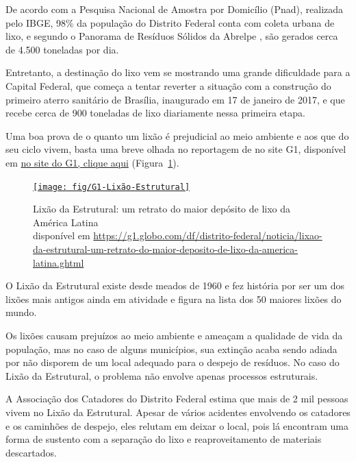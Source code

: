 De acordo com a Pesquisa Nacional de Amostra por Domicílio (Pnad), realizada pelo IBGE, 98\% da população do Distrito Federal conta com coleta urbana de lixo, e segundo o Panorama de Resíduos Sólidos da Abrelpe , são gerados cerca de 4.500 toneladas por dia.

Entretanto, a destinação do lixo vem se mostrando uma grande dificuldade para a Capital Federal, que começa a tentar reverter a situação com a construção do primeiro aterro sanitário de Brasília, inaugurado em 17 de janeiro de 2017, e que recebe cerca de 900 toneladas de lixo diariamente nessa primeira etapa.

Uma boa prova de o quanto um lixão é prejudicial ao meio ambiente e aos que do seu ciclo vivem, basta uma breve olhada no reportagem de  no site G1, disponível em \href{https://g1.globo.com/df/distrito-federal/noticia/lixao-da-estrutural-um-retrato-do-maior-deposito-de-lixo-da-america-latina.ghtml}{no site do G1, clique aqui} (Figura~\ref{fig:g1-lixao-estrutural}). \nocite{Marques2018}

\begin{figure}[h!]
    \centering
    \href{https://g1.globo.com/df/distrito-federal/noticia/lixao-da-estrutural-um-retrato-do-maior-deposito-de-lixo-da-america-latina.ghtml}{
        \texttt{[image: fig/G1-Lixão-Estrutural]}
    }
    \caption[Lixão da Estrutural]{Lixão da Estrutural: um retrato do maior depósito de lixo da América Latina \\ disponível em \url{https://g1.globo.com/df/distrito-federal/noticia/lixao-da-estrutural-um-retrato-do-maior-deposito-de-lixo-da-america-latina.ghtml}}
    \label{fig:g1-lixao-estrutural}
\end{figure}

O Lixão da Estrutural existe desde meados de 1960 e fez história por ser um dos lixões mais antigos ainda em atividade e figura na lista dos 50 maiores lixões do mundo.

Os lixões causam prejuízos ao meio ambiente e ameaçam a qualidade de vida da população, mas no caso de alguns municípios, sua extinção acaba sendo adiada por não disporem de um local adequado para o despejo de resíduos. No caso do Lixão da Estrutural, o problema não envolve apenas processos estruturais.

A Associação dos Catadores do Distrito Federal estima que mais de 2 mil pessoas vivem no Lixão da Estrutural. Apesar de vários acidentes envolvendo os catadores e os caminhões de despejo, eles relutam em deixar o local, pois lá encontram uma forma de sustento com a separação do lixo e reaproveitamento de materiais descartados.

